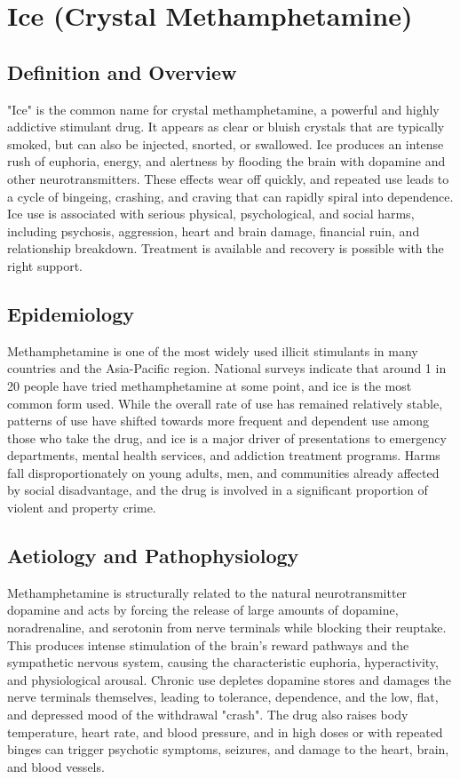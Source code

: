 \chapter{Ice (Crystal Methamphetamine)}

\section*{Definition and Overview}
"Ice" is the common name for crystal methamphetamine, a powerful and highly addictive stimulant drug. It appears as clear or bluish crystals that are typically smoked, but can also be injected, snorted, or swallowed. Ice produces an intense rush of euphoria, energy, and alertness by flooding the brain with dopamine and other neurotransmitters. These effects wear off quickly, and repeated use leads to a cycle of bingeing, crashing, and craving that can rapidly spiral into dependence. Ice use is associated with serious physical, psychological, and social harms, including psychosis, aggression, heart and brain damage, financial ruin, and relationship breakdown. Treatment is available and recovery is possible with the right support.

\section*{Epidemiology}
Methamphetamine is one of the most widely used illicit stimulants in many countries and the Asia-Pacific region. National surveys indicate that around 1 in 20 people have tried methamphetamine at some point, and ice is the most common form used. While the overall rate of use has remained relatively stable, patterns of use have shifted towards more frequent and dependent use among those who take the drug, and ice is a major driver of presentations to emergency departments, mental health services, and addiction treatment programs. Harms fall disproportionately on young adults, men, and communities already affected by social disadvantage, and the drug is involved in a significant proportion of violent and property crime.

\section*{Aetiology and Pathophysiology}
Methamphetamine is structurally related to the natural neurotransmitter dopamine and acts by forcing the release of large amounts of dopamine, noradrenaline, and serotonin from nerve terminals while blocking their reuptake. This produces intense stimulation of the brain's reward pathways and the sympathetic nervous system, causing the characteristic euphoria, hyperactivity, and physiological arousal. Chronic use depletes dopamine stores and damages the nerve terminals themselves, leading to tolerance, dependence, and the low, flat, and depressed mood of the withdrawal "crash". The drug also raises body temperature, heart rate, and blood pressure, and in high doses or with repeated binges can trigger psychotic symptoms, seizures, and damage to the heart, brain, and blood vessels.

